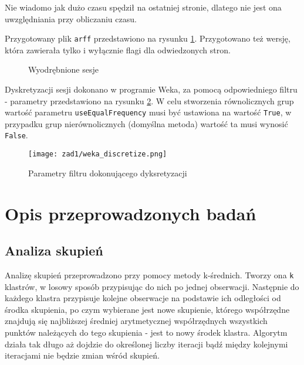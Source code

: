 \documentclass{classrep}
\begin{document}
    Nie wiadomo jak dużo czasu spędził na ostatniej stronie, dlatego nie jest ona uwzględniania przy obliczaniu czasu.
    
    Przygotowany plik \verb|arff| przedstawiono na rysunku \ref{fig:sessions_arff}. Przygotowano też wersję, która zawierała tylko i wyłącznie flagi dla odwiedzonych stron.
    
    \begin{figure}[H] 
    	\begin{center}
    	\label{fig:sessions_arff}
        \caption{Wyodrębnione sesje}
    	\end{center}
    \end{figure}
    
    Dyskretyzacji sesji dokonano w programie Weka, za pomocą odpowiedniego filtru - parametry przedstawiono na rysunku \ref{fig:weka_discretize}. W celu stworzenia równolicznych grup wartość parametru \verb|useEqualFrequency| musi być ustawiona na wartość \verb|True|, w przypadku grup nierównolicznych (domyślna metoda) wartość ta musi wynosić \verb|False|.
    
    \setlength{\abovecaptionskip}{4pt}
    
    \begin{figure}[H] 
    	\begin{center}
    	\texttt{[image: zad1/weka\_discretize.png]}
    	\label{fig:weka_discretize}
        \caption{Parametry filtru dokonującego dyksretyzacji}
    	\end{center}
    \end{figure}
    
    
\section{Opis przeprowadzonych badań}    
    
    \subsection{Analiza skupień}
    
    Analizę skupień przeprowadzono przy pomocy metody  k-średnich. Tworzy ona \verb|k| klastrów, w losowy sposób przypisując do nich po jednej obserwacji. Następnie do każdego klastra przypisuje kolejne obserwacje na podstawie ich odległości od środka skupienia, po czym wybierane jest nowe skupienie, którego współrzędne znajdują się najbliższej średniej arytmetycznej współrzędnych wszystkich punktów należących do tego skupienia - jest to nowy środek klastra. Algorytm działa tak długo aż dojdzie do określonej liczby iteracji bądź między kolejnymi iteracjami nie będzie zmian wśród skupień.
\end{document}
